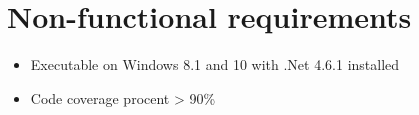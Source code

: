 \chapter{Non-functional requirements}

\begin{itemize}
	\item Executable on Windows 8.1 and 10 with .Net 4.6.1 installed
	\item Code coverage procent > 90\%
\end{itemize}